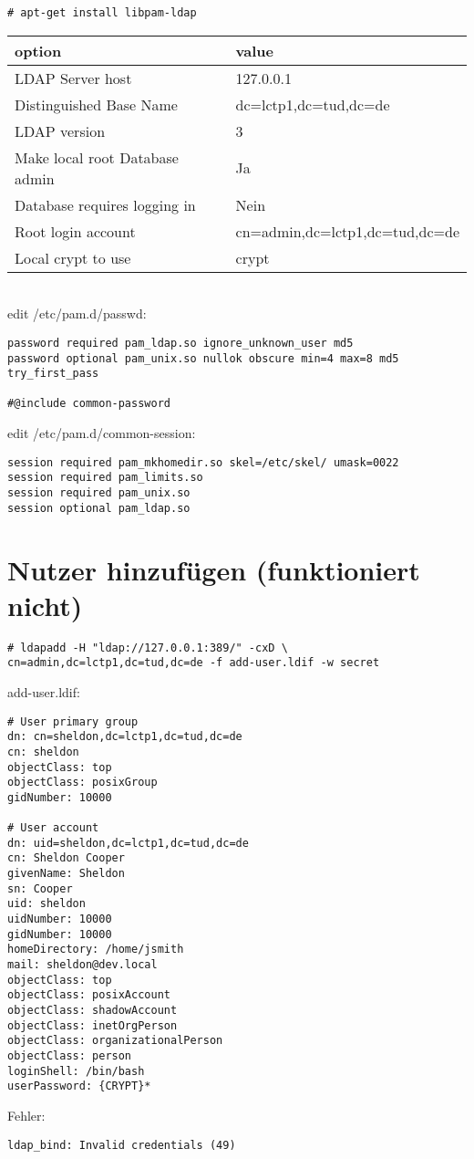 \begin{lstlisting}[style=Bash]
# apt-get install libpam-ldap
\end{lstlisting}
\begin{tabular}{ l | l }
 option & value\\
 \hline
 LDAP Server host & 127.0.0.1\\
 Distinguished Base Name & dc=lctp1,dc=tud,dc=de\\
 LDAP version & 3\\
 Make local root Database admin & Ja\\
 Database requires logging in & Nein\\
 Root login account & cn=admin,dc=lctp1,dc=tud,dc=de\\
 Local crypt to use & crypt\\
\end{tabular}
\\
edit /etc/pam.d/passwd:
\begin{lstlisting}[style=Bash]
password required pam_ldap.so ignore_unknown_user md5
password optional pam_unix.so nullok obscure min=4 max=8 md5 try_first_pass

#@include common-password
\end{lstlisting}
edit /etc/pam.d/common-session:
\begin{lstlisting}[style=Bash]
session required pam_mkhomedir.so skel=/etc/skel/ umask=0022
session required pam_limits.so
session required pam_unix.so
session optional pam_ldap.so
\end{lstlisting}

\section*{Nutzer hinzufügen (funktioniert nicht)}
\begin{lstlisting}[style=Bash]
# ldapadd -H "ldap://127.0.0.1:389/" -cxD \
cn=admin,dc=lctp1,dc=tud,dc=de -f add-user.ldif -w secret
\end{lstlisting}
add-user.ldif:
\begin{lstlisting}[style=Bash]
# User primary group
dn: cn=sheldon,dc=lctp1,dc=tud,dc=de
cn: sheldon
objectClass: top
objectClass: posixGroup
gidNumber: 10000

# User account
dn: uid=sheldon,dc=lctp1,dc=tud,dc=de
cn: Sheldon Cooper
givenName: Sheldon
sn: Cooper
uid: sheldon
uidNumber: 10000
gidNumber: 10000
homeDirectory: /home/jsmith
mail: sheldon@dev.local
objectClass: top
objectClass: posixAccount
objectClass: shadowAccount
objectClass: inetOrgPerson
objectClass: organizationalPerson
objectClass: person
loginShell: /bin/bash
userPassword: {CRYPT}*
\end{lstlisting}
Fehler:
\begin{lstlisting}[style=Bash]
ldap_bind: Invalid credentials (49)
\end{lstlisting}
